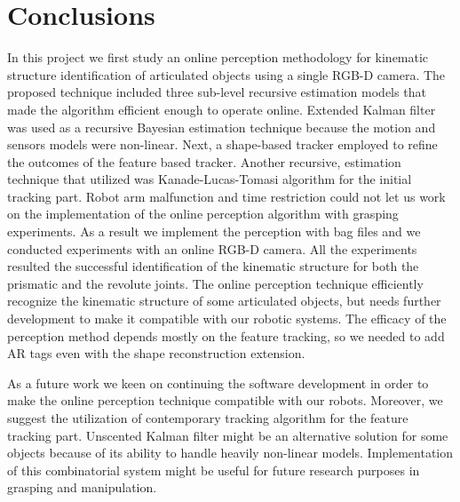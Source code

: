 \documentclass[letterpaper, 10 pt, conference]{ieeeconf}
\begin{document}
\section{Conclusions}\label{concl}
In this project we first study an online perception methodology for kinematic structure identification of articulated objects using a single RGB-D camera. The proposed technique included three sub-level recursive estimation models that made the algorithm efficient enough to operate online. Extended Kalman filter was used as a recursive Bayesian estimation technique because the motion  and sensors models were non-linear. Next, a shape-based tracker employed to refine the outcomes of the feature based tracker. Another recursive, estimation technique that utilized was Kanade-Lucas-Tomasi algorithm for the initial tracking part. Robot arm malfunction and time restriction could not let us work on the implementation of the online perception algorithm with grasping experiments. As a result we implement the perception with bag files and we conducted experiments with an online RGB-D camera. All the experiments resulted the successful identification of the kinematic structure for both the prismatic and the revolute joints. The online perception technique efficiently recognize the kinematic structure of some articulated objects, but needs further development to make it compatible with our robotic systems. The efficacy of the perception method depends mostly on the feature tracking, so we needed to add AR tags even with the shape reconstruction extension.  

As a future work we keen on continuing the software development in order to make the online perception technique compatible with our robots. Moreover, we suggest the utilization of contemporary tracking algorithm for the feature tracking part. Unscented Kalman filter might be an alternative solution for some objects because of its ability to handle heavily non-linear models. Implementation of this combinatorial system might be useful for future research purposes in grasping and manipulation.



\end{document}
